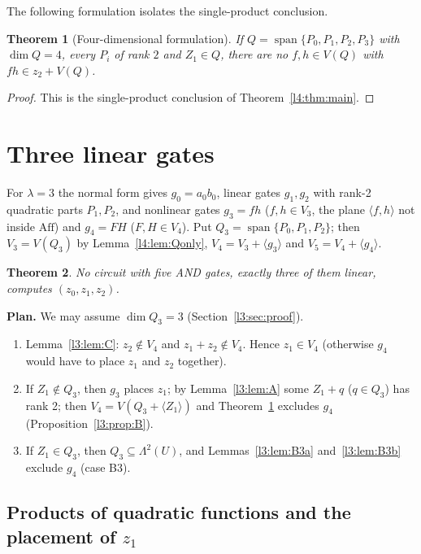 \documentclass[11pt,a4paper]{article}
\theoremstyle{plain}
\newtheorem{theorem}{Theorem}
\theoremstyle{remark}
\newcommand{\Aff}{\mathrm{Aff}}
\newcommand{\Span}{\operatorname{span}}
\newcommand{\Lam}{\Lambda^2}
\begin{document}
The following formulation isolates the single-product conclusion.
\begin{theorem}[Four-dimensional formulation]\label{l3:thm:L4}
If $Q=\Span\{P_0,P_1,P_2,P_3\}$ with $\dim Q=4$, every $P_i$ of rank $2$ and $Z_1\in Q$, there are no $f,h\in V(Q)$ with $fh\in z_2+V(Q)$.
\end{theorem}
\begin{proof}This is the single-product conclusion of Theorem~\ref{l4:thm:main}.\end{proof}
\section{Three linear gates}\label{sec:lambda3}


For $\lambda=3$ the normal form gives $g_0=a_0b_0$, linear gates $g_1,g_2$ with rank-2 quadratic parts $P_1,P_2$, and nonlinear gates $g_3=fh$ ($f,h\in V_3$, the plane $\langle f,h\rangle$ not inside $\Aff$) and $g_4=FH$ ($F,H\in V_4$). Put $Q_3=\Span\{P_0,P_1,P_2\}$; then $V_3=V(Q_3)$ by Lemma~\ref{l4:lem:Qonly}, $V_4=V_3+\langle g_3\rangle$ and $V_5=V_4+\langle g_4\rangle$.

\begin{theorem}\label{l3:thm:main}
No circuit with five AND gates, exactly three of them linear, computes $(z_0,z_1,z_2)$.
\end{theorem}

\noindent\textbf{Plan.} We may assume $\dim Q_3=3$ (Section~\ref{l3:sec:proof}).
\begin{enumerate}[1.]
\item Lemma~\ref{l3:lem:C}: $z_2\notin V_4$ and $z_1+z_2\notin V_4$. Hence $z_1\in V_4$ (otherwise $g_4$ would have to place $z_1$ and $z_2$ together).
\item If $Z_1\notin Q_3$, then $g_3$ places $z_1$; by Lemma~\ref{l3:lem:A} some $Z_1+q$ ($q\in Q_3$) has rank 2; then $V_4=V(Q_3+\langle Z_1\rangle)$ and Theorem~\ref{l3:thm:L4} excludes $g_4$ (Proposition~\ref{l3:prop:B}).
\item If $Z_1\in Q_3$, then $Q_3\subseteq\Lam(U)$, and Lemmas~\ref{l3:lem:B3a} and~\ref{l3:lem:B3b} exclude $g_4$ (case B3).
\end{enumerate}

\subsection[Products of quadratic functions and the placement of z1]{Products of quadratic functions and the placement of $z_1$}
\end{document}

